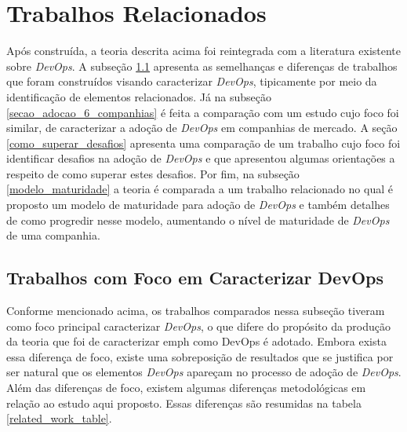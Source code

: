 \section{Trabalhos Relacionados}

Após construída, a teoria descrita acima foi reintegrada com a literatura
existente sobre {\it DevOps}. A subseção \ref{secao_caracterizacoes_devops}
apresenta as semelhanças e diferenças de trabalhos que foram construídos
visando caracterizar {\it DevOps}, tipicamente por meio da identificação de
elementos relacionados. Já na subseção \ref{secao_adocao_6_companhias} é
feita a comparação com um estudo cujo foco foi similar, de caracterizar a
adoção de {\it DevOps} em companhias de mercado. A seção \ref{como_superar_desafios}
apresenta uma comparação de um trabalho cujo foco foi identificar desafios na
adoção de {\it DevOps} e que apresentou algumas orientações a respeito de como
superar estes desafios. Por fim, na subseção \ref{modelo_maturidade} a teoria é
comparada a um trabalho relacionado no qual é proposto um modelo de maturidade
para adoção de {\it DevOps} e também detalhes de como progredir nesse modelo,
aumentando o nível de maturidade de {\it DevOps} de uma companhia.

\subsection{Trabalhos com Foco em Caracterizar DevOps}\label{secao_caracterizacoes_devops}

Conforme mencionado acima, os trabalhos comparados nessa subseção tiveram como
foco principal caracterizar {\it DevOps}, o que difere do propósito da produção
da teoria que foi de caracterizar {emph como DevOps é adotado}. Embora
exista essa diferença de foco, existe uma sobreposição de resultados que se
justifica por ser natural que os elementos {\it DevOps} apareçam no processo de
adoção de {\it DevOps}. Além das diferenças de foco, existem algumas
diferenças metodológicas em relação ao estudo aqui proposto. Essas diferenças
são resumidas na tabela \ref{related_work_table}.

